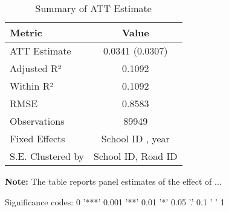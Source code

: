 \begin{table}[H]
\centering
\caption{Summary of ATT Estimate}
\label{tab:SA_math_50p}
 \begin{center}
 \begin{tabular}{lc}
 \toprule
Metric & Value \\
\midrule
ATT Estimate & 0.0341 (0.0307) \\
\hline 
 Adjusted R² & 0.1092 \\
Within R² & 0.1092 \\
RMSE & 0.8583 \\
Observations & 89949 \\
\hline 
 Fixed Effects & School ID ,  year \\
S.E. Clustered by & School ID, Road ID \\
\bottomrule
\end{tabular}
 \end{center}\begin{tablenotes}
\small
\item \textbf{Note:} The table reports panel estimates of the effect of ...
\item Significance codes: 0 '***' 0.001 '**' 0.01 '*' 0.05 '.' 0.1 ' ' 1
\end{tablenotes}
\end{table}